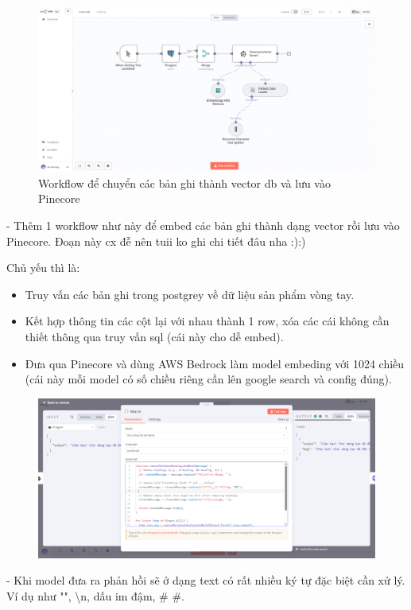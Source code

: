 \begin{figure}[htbp]
    \centering
    \includegraphics[width=1\linewidth]{Chap1-7/insertdb.pdf}
    \caption{Workflow để chuyển các bản ghi thành vector db và lưu vào Pinecore}
\end{figure}

- Thêm 1 workflow như này để embed các bản ghi thành dạng vector rồi lưu vào Pinecore. Đoạn này cx đễ nên tuii ko ghi chi tiết đâu nha :):)

Chủ yếu thì là:


\begin{itemize}
    \item Truy vấn các bản ghi trong postgrey về dữ liệu sản phẩm vòng tay.
    \item Kết hợp thông tin các cột lại với nhau thành 1 row, xóa các cái không cần thiết thông qua truy vấn sql (cái này cho dễ embed).
    \item Đưa qua Pinecore và dùng AWS Bedrock làm model embeding với 1024 chiều (cái này mỗi model có số chiều riêng cần lên google search và config đúng). 
\end{itemize}

\begin{figure}[htbp]
    \centering
    \includegraphics[width=1\linewidth]{Chap1-7/code-function-cleand.pdf}
\end{figure}
- Khi model đưa ra phản hồi sẽ ở dạng text có rất nhiều ký tự đặc biệt cần xử lý. Ví dụ như "", \textbackslash n, dấu im đậm, \# \#.

